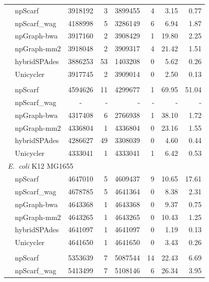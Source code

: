 \documentclass[10pt,twocolumn,twoside]{genpaper}
\newcommand{\ec}{\emph{E.~coli}}
\begin{document}
\begin{longtable}[!hpt]{llcrrrrr}
\nobreakmidrule
& npScarf & 3918192  &  3  &  3899455  &  4  & 3.15  & 0.77 \\*
& npScarf\_wag & 4188998  &  5  &  3286149  &  6  & 6.94  & 1.87 \\*
& npGraph-bwa & 3917160  &  2  &  3908429  &  1 & 19.80  & 2.25 \\*
& npGraph-mm2 & 3918048  &  2  &  3909317  &  4 & 21.42  & 1.51 \\*
& hybridSPAdes &  3886253 &  53  &  1403208  &  0  & 5.62  & 0.26\\*
& Unicycler & 3917745  &  2 & 3909014  & 0  & 2.50  &  0.13\\
\hline
\rowcolor{Gray}
\multicolumn{8}{l}{\emph{Acinetobacter} AB30} \\* %
\nobreakmidrule
\rowcolor{Gray}
& npScarf & 4594626  &  11  &  4299677  &  1  & 69.95  & 51.04\\*
\rowcolor{Gray}
& npScarf\_wag & -  &  -  &  -  & -   &  - & -\\*
\rowcolor{Gray}
& npGraph-bwa & 4317408  &  6  &  2766938  &  1  & 38.10  & 1.72\\*
\rowcolor{Gray}
& npGraph-mm2 & 4336804  &  1  &  4336804  & 0   &  23.16 & 1.55\\*
\rowcolor{Gray}
& hybridSPAdes & 4286627  &  49  &  3308039  &  0  &  4.60 &  0.44\\*
\rowcolor{Gray}
& Unicycler &  4333041 &  1  &  4333041  &  1  &  6.42 &  0.53\\
\hline
\multicolumn{8}{l}{\ec{} K12 MG1655} \\* %
\nobreakmidrule
& npScarf & 4647010  &  5  &  4609437  &  9  & 10.65  & 17.61 \\*
& npScarf\_wag &  4678785 &  5  &  4641364  &  0  & 8.38  &  2.31\\*
& npGraph-bwa & 4643368  &  1  &  4643368  & 0  &  9.37 & 0.75 \\*
& npGraph-mm2 & 4643265  &  1  &  4643265  &  0 &  10.43 & 1.25 \\*
& hybridSPAdes &  4641097 &  1  &  4641097  &  0  & 1.19  & 0.13\\*
& Unicycler & 4641650  &  1 &  4641650 &  0 & 3.43  & 0.26 \\
\hline
\rowcolor{Gray}
\multicolumn{8}{l}{\ec{} O25b H4-ST131} \\* %
\nobreakmidrule
\rowcolor{Gray}
& npScarf &  5353639 &  7  &  5087544  &  14  &  22.43 & 6.69\\*
\rowcolor{Gray}
& npScarf\_wag & 5413499  &  7  &  5108146  &  6  &  26.34 & 3.95\\*

\end{longtable}
\end{document}
